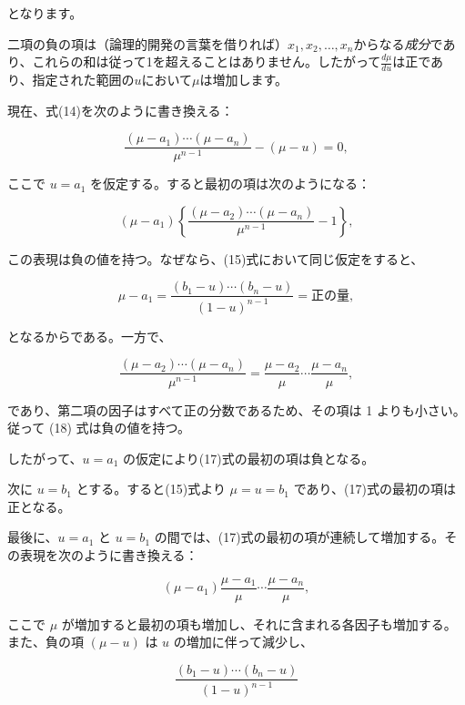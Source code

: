 \documentclass[a4paper,11pt,openany]{ltjsbook}
\begin{document}
となります。

二項の負の項は（論理的開発の言葉を借りれば）$x_1, x_2, \dotsc, x_n$からなる\emph{成分}であり、これらの和は従って1を超えることはありません。したがって$\displaystyle \frac{d\mu}{du}$は正であり、指定された範囲の$u$において$\mu$は増加します。

現在、式(14)を次のように書き換える：

\begin{equation}\tag{17}
\frac{(\mu-a_1)\cdots(\mu-a_n)}{\mu^{n-1}} - (\mu-u) = 0,
\end{equation}

ここで $u = a_1$ を仮定する。すると最初の項は次のようになる：

\begin{equation}\tag{18}
(\mu-a_1)\left\{\frac{(\mu-a_2)\cdots(\mu-a_n)}{\mu^{n-1}} - 1\right\},
\end{equation}

この表現は負の値を持つ。なぜなら、(15)式において同じ仮定をすると、

\begin{equation*}
\mu - a_1 = \frac{(b_1 - u)\cdots(b_n - u)}{(1-u)^{n-1}}
= \text{正の量},
\end{equation*}

となるからである。一方で、

\begin{equation*}
\frac{(\mu-a_2)\cdots (\mu - a_n)}{\mu^{n-1}}
=\frac{\mu-a_2}{\mu} \cdots \frac{\mu-a_n}{\mu},
\end{equation*}

であり、第二項の因子はすべて正の分数であるため、その項は 1 よりも小さい。従って (18) 式は負の値を持つ。

したがって、$u = a_1$ の仮定により(17)式の最初の項は負となる。

次に $u = b_1$ とする。すると(15)式より $\mu=u=b_1$ であり、(17)式の最初の項は正となる。

最後に、$u=a_1$ と $u=b_1$ の間では、(17)式の最初の項が連続して増加する。その表現を次のように書き換える：

\begin{equation*}
(\mu-a_1)\frac{\mu - a_1}{\mu}\cdots \frac{\mu-a_n}{\mu},
\end{equation*}

ここで $\mu$ が増加すると最初の項も増加し、それに含まれる各因子も増加する。また、負の項 $(\mu-u)$ は $u$ の増加に伴って減少し、

\begin{equation*}
\frac{(b_1-u)\cdots(b_n-u)}{(1-u)^{n-1}}
\end{equation*}
\end{document}

